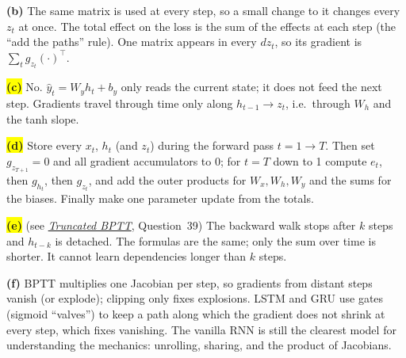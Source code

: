 \documentclass[12pt,a4paper]{article}
\newcommand{\seeconcept}[3]{(see \hyperref[#1]{\textit{#2}}, Question~#3)}
\newcommand{\hlq}[1]{{\setlength{\fboxsep}{1.5pt}\colorbox{yellow}{#1}}}
\begin{document}
\textbf{(b)} The same matrix is used at every step, so a small change to it changes every $z_t$ at once. The total effect on the loss is the sum of the effects at each step (the ``add the paths'' rule). One matrix appears in every $dz_t$, so its gradient is $\sum_tg_{z_t}(\cdot)^\top$.

\hlq{\textbf{(c)}} No. $\hat y_t=W_yh_t+b_y$ only reads the current state; it does not feed the next step. Gradients travel through time only along $h_{t-1}\to z_t$, i.e.\ through $W_h$ and the tanh slope.

\hlq{\textbf{(d)}} Store every $x_t$, $h_t$ (and $z_t$) during the forward pass $t=1\to T$. Then set $g_{z_{T+1}}=0$ and all gradient accumulators to 0; for $t=T$ down to 1 compute $e_t$, then $g_{h_t}$, then $g_{z_t}$, and add the outer products for $W_x,W_h,W_y$ and the sums for the biases. Finally make one parameter update from the totals.

\hlq{\textbf{(e)}} \seeconcept{c:truncated}{Truncated BPTT}{39} The backward walk stops after $k$ steps and $h_{t-k}$ is detached. The formulas are the same; only the sum over time is shorter. It cannot learn dependencies longer than $k$ steps.

\textbf{(f)} BPTT multiplies one Jacobian per step, so gradients from distant steps vanish (or explode); clipping only fixes explosions. LSTM and GRU use gates (sigmoid ``valves'') to keep a path along which the gradient does not shrink at every step, which fixes vanishing. The vanilla RNN is still the clearest model for understanding the mechanics: unrolling, sharing, and the product of Jacobians.
\end{document}
